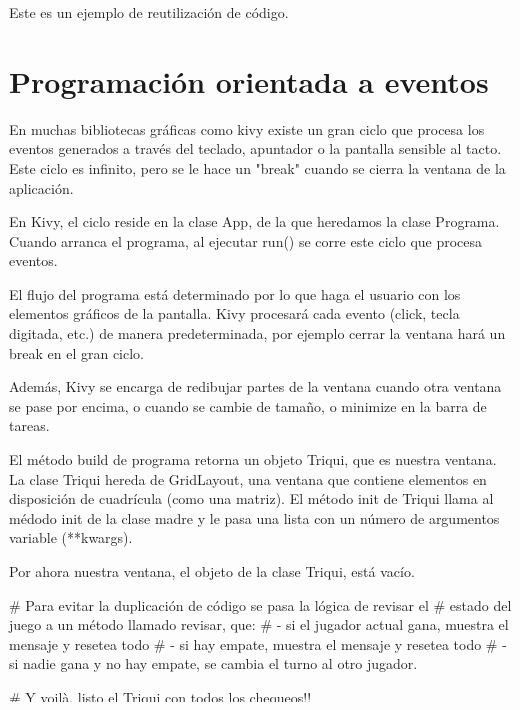 Este es un ejemplo de reutilización de código.

\section{Programación orientada a eventos}

En muchas bibliotecas gráficas como kivy existe un gran ciclo que procesa
los eventos generados a través del teclado, apuntador o la pantalla
sensible al tacto. Este ciclo es infinito, pero se le hace un "break"
cuando se cierra la ventana de la aplicación.

En Kivy, el ciclo reside en la clase App, de la que heredamos la clase
Programa. Cuando arranca el programa, al ejecutar run() se corre este
ciclo que procesa eventos.

El flujo del programa está determinado por lo que haga el usuario con
los elementos gráficos de la pantalla. Kivy procesará cada evento (click,
tecla digitada, etc.) de manera predeterminada, por ejemplo cerrar la
ventana hará un break en el gran ciclo.

Además, Kivy se encarga de redibujar partes de la ventana cuando otra
ventana se pase por encima, o cuando se cambie de tamaño, o minimize en
la barra de tareas.

El método build de programa retorna un objeto Triqui, que es nuestra ventana.
La clase Triqui hereda de GridLayout, una ventana que contiene elementos
en disposición de cuadrícula (como una matriz). El método init de Triqui
llama al médodo init de la clase madre y le pasa una lista con un número
de argumentos variable (**kwargs). 

Por ahora nuestra ventana, el objeto de la clase Triqui, está vacío.


# Para evitar la duplicación de código se pasa la lógica de revisar el
# estado del juego a un método llamado revisar, que:
# - si el jugador actual gana, muestra el mensaje y resetea todo
# - si hay empate, muestra el mensaje y resetea todo
# - si nadie gana y no hay empate, se cambia el turno al otro jugador.

# Y voilà, listo el Triqui con todos los chequeos!!

\beforeverb
\begin{verbatim}
# triqui8.py
\end{verbatim}
\afterverb


\beforeverb
\begin{verbatim}
# triqui8.py
\end{verbatim}
\afterverb

